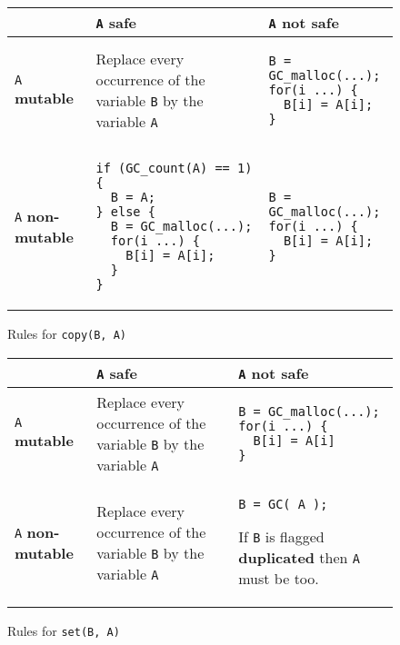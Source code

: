 \documentclass[12pt,a4paper]{article}
\newcommand{\cl}[1]{\texttt{#1}}
\newcommand{\mut}{  \textbf{ mutable } }
\newcommand{\nmut}{ \textbf{ non-mutable } }
\newcommand{\safe}{ \textbf{ safe } }
\newcommand{\dupl}{ \textbf{ duplicated } }
\begin{document}
\begin{figure}[!ht]
\begin{tabular}{|p{5.5cm}|p{5.5cm}|p{6cm}|}
\hline
             & \cl{A} \safe & \cl{A} not \safe \\ \hline
\cl{A} \mut  & Replace every occurrence of the variable \cl{B} by the variable \cl{A} & \begin{lstlisting}
B = GC_malloc(...);
for(i ...) {
  B[i] = A[i];
}
\end{lstlisting} \\ \hline
\cl{A} \nmut & \begin{lstlisting}
if (GC_count(A) == 1) {
  B = A;
} else {
  B = GC_malloc(...);
  for(i ...) {
    B[i] = A[i];
  }
}
\end{lstlisting} & \begin{lstlisting}
B = GC_malloc(...);
for(i ...) {
  B[i] = A[i];
}
\end{lstlisting} \\ \hline
\end{tabular}
\caption{Rules for \cl{copy(B, A)}}
\end{figure}



\begin{figure}[!ht]
\begin{tabular}{|p{5.5cm}|p{5.5cm}|p{6cm}|}
\hline
             & \cl{A} \safe & \cl{A} not \safe \\ \hline
\cl{A} \mut  & Replace every occurrence of the variable \cl{B} by the variable \cl{A} & \begin{lstlisting}
B = GC_malloc(...);
for(i ...) {
  B[i] = A[i]
}
\end{lstlisting} \\ \hline
\cl{A} \nmut & Replace every occurrence of the variable \cl{B} by the variable \cl{A} & \begin{lstlisting}
B = GC( A );
\end{lstlisting}
If \cl{B} is flagged \dupl then \cl{A} must be too.
\\ \hline
\end{tabular}
\caption{Rules for \cl{set(B, A)}}
\end{figure}
\end{document}
